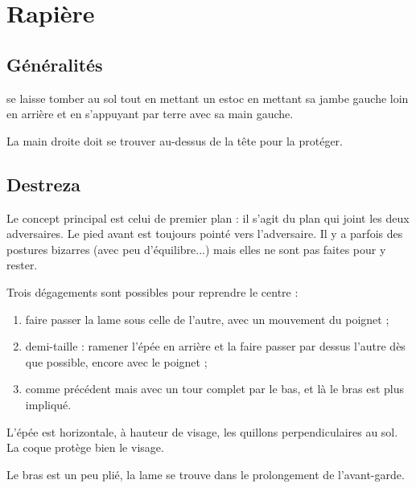 \chapter{Rapière}


\section{Généralités}


\begin{technique}

\A se laisse tomber au sol tout en mettant un estoc en mettant sa jambe gauche loin en arrière et en s'appuyant par terre avec sa main gauche.

La main droite doit se trouver au-dessus de la tête pour la protéger.

\end{technique}


\section{Destreza}


Le concept principal est celui de premier plan : il s'agit du plan qui joint les deux adversaires.
Le pied avant est toujours pointé vers l'adversaire.
Il y a parfois des postures bizarres (avec peu d'équilibre...) mais elles ne sont pas faites pour y rester.

Trois dégagements sont possibles pour reprendre le centre :
\begin{enumerate}
	\it
	\item faire passer la lame sous celle de l'autre, avec un mouvement du poignet ;
	\item demi-taille : ramener l'épée en arrière et la faire passer par dessus l'autre dès que possible, encore avec le poignet ;
	\item comme précédent mais avec un tour complet par le bas, et là le bras est plus impliqué.
\end{enumerate}


\begin{garde}

L'épée est horizontale, à hauteur de visage, les quillons perpendiculaires au sol.
La coque protège bien le visage.
\end{garde}


\begin{garde}

Le bras est un peu plié, la lame se trouve dans le prolongement de l'avant-garde.
\end{garde}

